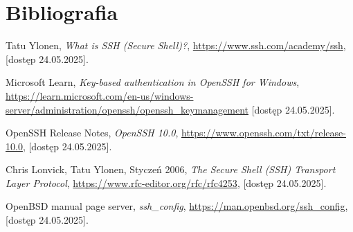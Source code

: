 \documentclass{article}
\newcounter{firstbib} %
\begin{document}
\section{Bibliografia}
\renewcommand{\refname}{Artykuły}
\begin{thebibliography}{9}

    Tatu Ylonen,
    \emph{What is SSH (Secure Shell)?},
    \url{https://www.ssh.com/academy/ssh},
    [dostęp 24.05.2025].
    
    Microsoft Learn,
    \emph{Key-based authentication in OpenSSH for Windows},
    \url{https://learn.microsoft.com/en-us/windows-server/administration/openssh/openssh_keymanagement}
    [dostęp 24.05.2025].

    OpenSSH Release Notes,
    \emph{OpenSSH 10.0},
    \url{https://www.openssh.com/txt/release-10.0},
    [dostęp 24.05.2025].
    
\setcounter{firstbib}{\value{enumiv}}
\end{thebibliography}
\renewcommand{\refname}{Dokumentacje techniczne}
\begin{thebibliography}{9}
\setcounter{enumiv}{\value{firstbib}}

    Chris Lonvick, Tatu Ylonen,
    Styczeń 2006,
    \emph{The Secure Shell (SSH) Transport Layer Protocol},
    \url{https://www.rfc-editor.org/rfc/rfc4253},
    [dostęp 24.05.2025].    

    OpenBSD manual page server,
    \emph{ssh\_config},
    \url{https://man.openbsd.org/ssh_config},
    [dostęp 24.05.2025].    
    
\end{thebibliography}
\end{document}
